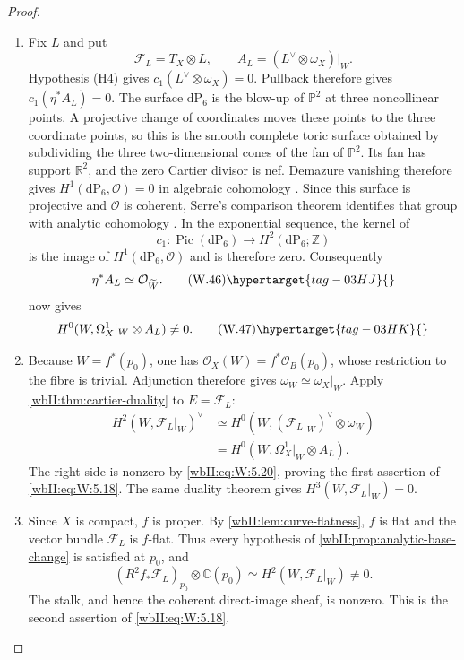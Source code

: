 \begin{proof}

\begin{enumerate}[label={$\langle1\rangle$\arabic*.},leftmargin=*]
\item Fix $L$ and put
\[
\mathcal F_L=T_X\otimes L,\qquad
A_L=(L^\vee\otimes\omega_X)|_W.
\]
Hypothesis (H4) gives $c_1(L^\vee\otimes\omega_X)=0$.  Pullback therefore
gives $c_1(\eta^*A_L)=0$. The surface $\mathrm{dP}_6$ is the blow-up of
$\mathbb P^2$ at three noncollinear points. A projective change of coordinates
moves these points to the three coordinate points, so this is the smooth
complete toric surface obtained by subdividing the three two-dimensional
cones of the fan of $\mathbb P^2$. Its fan has support $\mathbb R^2$,
and the zero Cartier divisor is nef. Demazure vanishing therefore gives
$H^1(\mathrm{dP}_6,\mathcal O)=0$ in algebraic cohomology
\cite[Theorem~9.2.3, author preprint p.~410]{CoxLittleSchenck2011}.
Since this surface is projective and $\mathcal O$ is coherent,
Serre's comparison theorem identifies that group with analytic cohomology
\cite[\S12, Theorem~1, p.~19]{Serre1956GAGA}.
In the exponential sequence, the kernel
of
\[
c_1:\operatorname{Pic}(\mathrm{dP}_6)\longrightarrow
H^2(\mathrm{dP}_6;\mathbb Z)
\]
is the image of $H^1(\mathrm{dP}_6,\mathcal O)$ and is therefore zero.
Consequently
\[
\eta^*A_L\simeq\mathcal O_{\widetilde W}.
\tag{W.46}\hypertarget{tag-03HJ}{}\label{wbII:eq:W:5.19}
\]
 now gives
\[
H^0(W,\Omega^1_X|_W\otimes A_L)\ne0.
\tag{W.47}\hypertarget{tag-03HK}{}\label{wbII:eq:W:5.20}
\]

\item Because $W=f^*(p_0)$, one has
$\mathcal O_X(W)=f^*\mathcal O_B(p_0)$, whose restriction to the fibre is
trivial.  Adjunction therefore gives $\omega_W\simeq\omega_X|_W$.
Apply \cref{wbII:thm:cartier-duality} to $E=\mathcal F_L$:
\[
\begin{split}
H^2(W,\mathcal F_L|_W)^\vee
&\simeq H^0(W,(\mathcal F_L|_W)^\vee\otimes\omega_W)\\
&=H^0(W,\Omega^1_X|_W\otimes A_L).
\end{split}
\]
The right side is nonzero by \eqref{wbII:eq:W:5.20}, proving the first assertion of \eqref{wbII:eq:W:5.18}.
The same duality theorem gives
$H^3(W,\mathcal F_L|_W)=0$.

\item Since $X$ is compact, $f$ is proper.  By
\cref{wbII:lem:curve-flatness}, $f$ is flat and the vector bundle
$\mathcal F_L$ is $f$-flat.  Thus every hypothesis of
\cref{wbII:prop:analytic-base-change} is satisfied at $p_0$, and
\[
(R^2f_*\mathcal F_L)_{p_0}\otimes\mathbb C(p_0)
\simeq H^2(W,\mathcal F_L|_W)\ne0.
\]
The stalk, and hence the coherent direct-image sheaf, is nonzero.  This is
the second assertion of \eqref{wbII:eq:W:5.18}.

\end{enumerate}
\end{proof}
